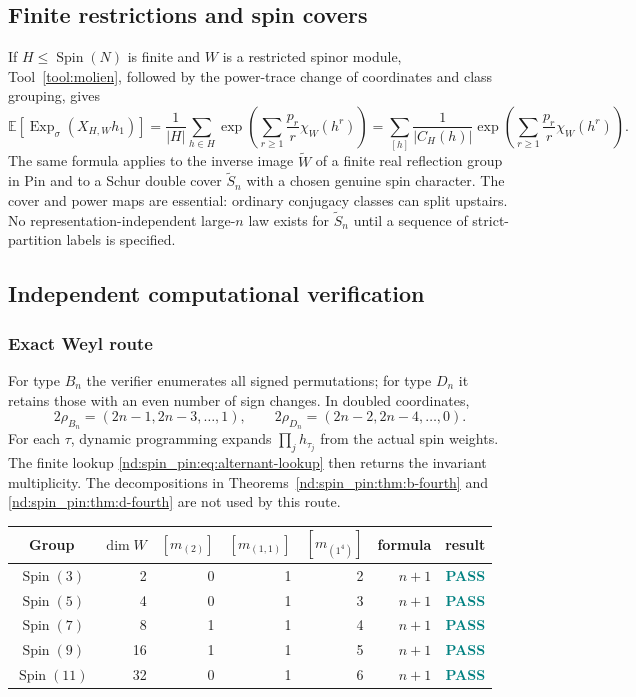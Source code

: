 \documentclass[10pt]{article}
\newcommand{\ExpS}{\operatorname{Exp}_{\sigma}}
\newcommand{\smgv}[2]{\mathbb E\!\left[\ExpS\!\left(X_{#1,#2}h_1\right)\right]}
\begin{document}
\subsection{Finite restrictions and spin covers}

If $H\le\operatorname{Spin}(N)$ is finite and $W$ is a restricted spinor
module, Tool~\ref{tool:molien}, followed by the power-trace change of
coordinates and class grouping, gives
\begin{equation}\label{nd:spin_pin:eq:finite-restriction}
 \smgv{H}{W}=\frac1{|H|}\sum_{h\in H}
 \exp\!\left(\sum_{r\ge1}\frac{p_r}{r}\chi_W(h^r)\right)
 =\sum_{[h]}\frac1{|C_H(h)|}
 \exp\!\left(\sum_{r\ge1}\frac{p_r}{r}\chi_W(h^r)\right).
\end{equation}
The same formula applies to the inverse image $\widetilde W$ of a finite real
reflection group in Pin and to a Schur double cover $\widetilde S_n$ with a
chosen genuine spin character.  The cover and power maps are essential:
ordinary conjugacy classes can split upstairs.  No representation-independent
large-$n$ law exists for $\widetilde S_n$ until a sequence of strict-partition
labels is specified.

\subsection{Independent computational verification}

\subsubsection{Exact Weyl route}

For type $B_n$ the verifier enumerates all signed permutations; for type
$D_n$ it retains those with an even number of sign changes.  In doubled
coordinates,
\[
 2\rho_{B_n}=(2n-1,2n-3,\ldots,1),\qquad
 2\rho_{D_n}=(2n-2,2n-4,\ldots,0).
\]
For each $\tau$, dynamic programming expands
$\prod_jh_{\tau_j}$ from the actual spin weights.  The finite lookup
\eqref{nd:spin_pin:eq:alternant-lookup} then returns the invariant multiplicity.  The
decompositions in Theorems~\ref{nd:spin_pin:thm:b-fourth} and \ref{nd:spin_pin:thm:d-fourth} are not
used by this route.

\begin{center}
\begin{tabular}{@{}c@{\quad}r@{\quad}rrrr@{\quad}c@{}}
\toprule
Group&$\dim W$&$[m_{(2)}]$&$[m_{(1,1)}]$&$[m_{(1^4)}]$&formula&result\\
\midrule
$\operatorname{Spin}(3)$&2&0&1&2&$n+1$&\textcolor{teal}{\textbf{PASS}}\\
$\operatorname{Spin}(5)$&4&0&1&3&$n+1$&\textcolor{teal}{\textbf{PASS}}\\
$\operatorname{Spin}(7)$&8&1&1&4&$n+1$&\textcolor{teal}{\textbf{PASS}}\\
$\operatorname{Spin}(9)$&16&1&1&5&$n+1$&\textcolor{teal}{\textbf{PASS}}\\
$\operatorname{Spin}(11)$&32&0&1&6&$n+1$&\textcolor{teal}{\textbf{PASS}}\\
\bottomrule
\end{tabular}
\end{center}
\end{document}
